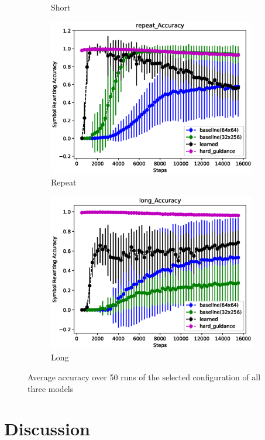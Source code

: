 \begin{figure}[H]
\begin{subfigure}{0.5\linewidth}
		\caption{Short}\label{short-acc}
	\end{subfigure}
	\begin{subfigure}{0.5\linewidth}
		\includegraphics[width=0.95\linewidth]{./figs/sr/repeat-acc-eps}
		\caption{Repeat}\label{repeat-acc}
	\end{subfigure}
	\begin{subfigure}{0.5\linewidth}
		\includegraphics[width=0.95\linewidth]{./figs/sr/long-acc-eps}
		\caption{Long}\label{long-acc}
	\end{subfigure}
	\caption{Average accuracy over 50 runs of the selected configuration of all three models}\label{sr-all-acc}
\end{figure}

\section{Discussion}

